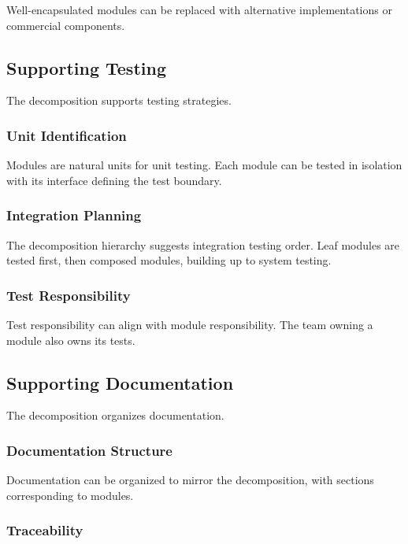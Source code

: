 \documentclass[11pt]{article}
\begin{document}
Well-encapsulated modules can be replaced with alternative implementations or commercial components.

\subsection{Supporting Testing}

The decomposition supports testing strategies.

\subsubsection{Unit Identification}

Modules are natural units for unit testing. Each module can be tested in isolation with its interface defining the test boundary.

\subsubsection{Integration Planning}

The decomposition hierarchy suggests integration testing order. Leaf modules are tested first, then composed modules, building up to system testing.

\subsubsection{Test Responsibility}

Test responsibility can align with module responsibility. The team owning a module also owns its tests.

\subsection{Supporting Documentation}

The decomposition organizes documentation.

\subsubsection{Documentation Structure}

Documentation can be organized to mirror the decomposition, with sections corresponding to modules.

\subsubsection{Traceability}
\end{document}

